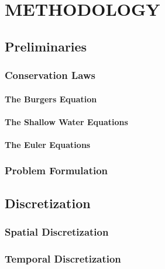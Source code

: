 \chapter{METHODOLOGY}

\section{Preliminaries}
  \subsection{Conservation Laws}
    
    \subsubsection{The Burgers Equation}
    \subsubsection{The Shallow Water Equations\label{sec:shallowwater}}
%      
    \subsubsection{The Euler Equations}
  \subsection{Problem Formulation}
    
\section{Discretization}
  \subsection{Spatial Discretization\label{sec:spatial_discretization}}
    
  \subsection{Temporal Discretization\label{sec:temporal_discretization}}
